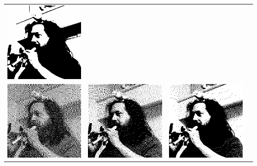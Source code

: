 \begin{tabular}{llll}
	\includegraphics{weiro-tanhi.png} \\
	\includegraphics{weiro-ditanh0.png} &
	\includegraphics{weiro-ditanh3.png} &
	\includegraphics{weiro-ditanh7.png} &

\end{tabular}
